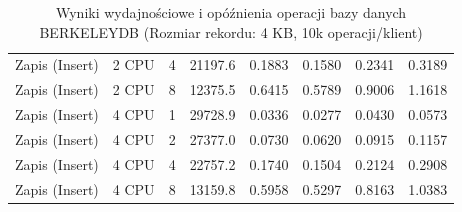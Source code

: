 \begin{table}[ht]
{\begin{tabular}{llcrrrrr}
Zapis (Insert) & 2 CPU & 4 & 21197.6 & 0.1883 & 0.1580 & 0.2341 & 0.3189 \\
Zapis (Insert) & 2 CPU & 8 & 12375.5 & 0.6415 & 0.5789 & 0.9006 & 1.1618 \\
Zapis (Insert) & 4 CPU & 1 & 29728.9 & 0.0336 & 0.0277 & 0.0430 & 0.0573 \\
Zapis (Insert) & 4 CPU & 2 & 27377.0 & 0.0730 & 0.0620 & 0.0915 & 0.1157 \\
Zapis (Insert) & 4 CPU & 4 & 22757.2 & 0.1740 & 0.1504 & 0.2124 & 0.2908 \\
Zapis (Insert) & 4 CPU & 8 & 13159.8 & 0.5958 & 0.5297 & 0.8163 & 1.0383 \\
\bottomrule
\end{tabular}%
}
\caption{Wyniki wydajnościowe i opóźnienia operacji bazy danych BERKELEYDB (Rozmiar rekordu: 4 KB, 10k operacji/klient)}
\label{tab:latency_berkeleydb_medium_10000}
\end{table}
